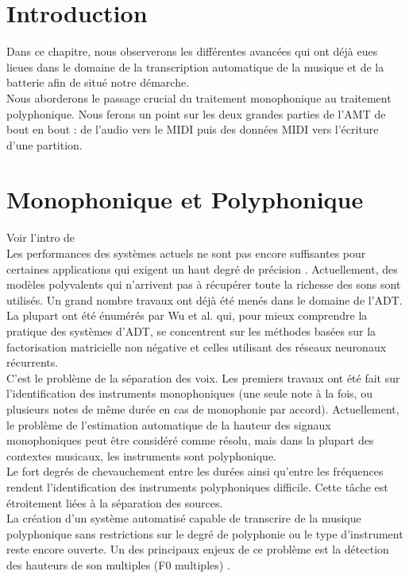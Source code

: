 \section*{Introduction}
Dans ce chapitre, nous observerons les différentes avancées qui ont déjà eues lieues dans le domaine de la transcription automatique de la musique et de la batterie afin de situé notre démarche.\\
Nous aborderons le passage crucial du traitement monophonique au traitement polyphonique. Nous ferons un point sur les deux grandes parties de l’AMT de bout en bout : de l’audio vers le MIDI puis des données MIDI vers l’écriture d’une partition.
  
\section{Monophonique et Polyphonique}
Voir l’intro de \cite{article1}\\
Les performances des systèmes actuels ne sont pas encore suffisantes pour certaines applications qui exigent un haut degré de précision \cite{article1}.
Actuellement, des modèles polyvalents qui n’arrivent pas à récupérer toute la richesse des sons sont utilisés.
Un grand nombre travaux ont déjà été menés dans le domaine de l’ADT. La plupart ont été énumérés par Wu et al. \cite{8350302} qui, pour mieux comprendre la pratique des systèmes d’ADT, se concentrent sur les méthodes basées sur la factorisation matricielle non négative et celles utilisant des réseaux neuronaux récurrents.\\
C’est le problème de la séparation des voix.
Les premiers travaux ont été fait sur l’identification des instruments monophoniques (une seule note à la fois, ou plusieurs notes de même durée en cas de monophonie par accord). Actuellement, le problème de l'estimation automatique de la hauteur des signaux monophoniques peut être considéré comme résolu, mais dans la plupart des contextes musicaux, les instruments sont polyphonique.\\
Le fort degrés de chevauchement entre les durées ainsi qu’entre les fréquences rendent l’identification des instruments polyphoniques difficile. Cette tâche est étroitement liées à la séparation des sources.\\
La création d'un système automatisé capable de transcrire de la musique polyphonique sans restrictions sur le degré de polyphonie ou le type d'instrument reste encore ouverte. Un des principaux enjeux de ce problème est la détection des hauteurs de son multiples (F0 multiples) \cite{article1}.
